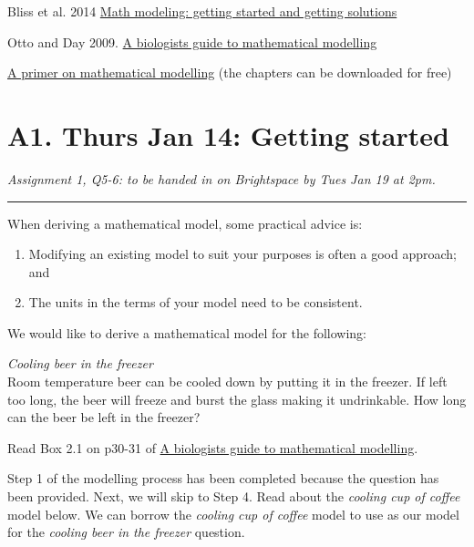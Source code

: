 \documentclass[]{book}
\providecommand{\tightlist}{%
  \setlength{\itemsep}{0pt}\setlength{\parskip}{0pt}}
\begin{document}
Bliss et al. 2014
\href{https://m3challenge.siam.org/sites/default/files/uploads/siam-guidebook-final-press.pdf}{Math
modeling: getting started and getting solutions}

Otto and Day 2009.
\href{https://ebookcentral-proquest-com.qe2a-proxy.mun.ca/lib/MUN/detail.action?docID=768551}{A
biologists guide to mathematical modelling}

\href{https://link-springer-com.qe2a-proxy.mun.ca/book/10.1007\%2F978-3-030-44541-6}{A
primer on mathematical modelling} (the chapters can be downloaded for
free)

\chapter{A1. Thurs Jan 14: Getting
started}\label{a1.-thurs-jan-14-getting-started}

\emph{Assignment 1, Q5-6: to be handed in on Brightspace by Tues Jan 19
at 2pm.}

\begin{center}\rule{0.5\linewidth}{0.5pt}\end{center}

When deriving a mathematical model, some practical advice is:

\begin{enumerate}
\def\labelenumi{\alph{enumi}.}
\tightlist
\item
  Modifying an existing model to suit your purposes is often a good
  approach; and\\
\item
  The units in the terms of your model need to be consistent.\\
\end{enumerate}

We would like to derive a mathematical model for the following:

\emph{Cooling beer in the freezer}\\
Room temperature beer can be cooled down by putting it in the freezer.
If left too long, the beer will freeze and burst the glass making it
undrinkable. How long can the beer be left in the freezer?

Read Box 2.1 on p30-31 of
\href{https://ebookcentral-proquest-com.qe2a-proxy.mun.ca/lib/MUN/detail.action?docID=768551}{A
biologists guide to mathematical modelling}.

Step 1 of the modelling process has been completed because the question
has been provided. Next, we will skip to Step 4. Read about the
\emph{cooling cup of coffee} model below. We can borrow the
\emph{cooling cup of coffee} model to use as our model for the
\emph{cooling beer in the freezer} question.
\end{document}
